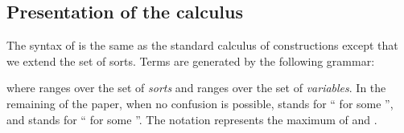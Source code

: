 \documentclass[a4paper,USenglish]{lipics}
\def\ecc{\textsf{ECC}\xspace}
\def\cic{\textsf{CIC}\xspace}
\def\cicr{\xspace}
\newcommand{\ECC}{{\ecc}}
\begin{document}
\begin{comment}
In  any  is populated with two classes of inhabitants:
\begin{enumerate}
   \item The class of \emph{arities} consists of expressions
 convertible to a sort (,  or  with ) or to a product
concluded by a sort (e.g. , , , ...).
   \item The class of \emph{simple types} consists of the remaining expressions. It contains all the inhabitants of  and 
    and also types in high universes like  or
    with .
\end{enumerate}


We observe the same
phenomenon in the proof of strong normalization of \ECC (the calculus of
constructions with universes, -types and an impredicative sort for
propositions) \cite{DBLP:conf/lics/Luo89, Luo90}. In order to adapt proof techniques
used for the calculus of constructions without universes to his calculus, the
author had to prove beforehand a ``quasinormalization'' theorem for assigning a
rank to expressions of type  from the shape of their head-normal
forms.

The central claim of our article is that the cohabitation of arities and
simple types in the same sort may be seen as a lack of typing of \cic. We
propose here a refinement of \cic which gives different types to
arities and simple types.
\end{comment}

\subsection{Presentation of the calculus}

The syntax of \cicr is the same as the standard calculus of
constructions except that we extend the set of sorts. Terms are generated by the following grammar:
\newcommand{\pouf}{\hspace{0.8em}}
 
\begin{comment}

\end{comment}
where  ranges over the set
  of \emph{sorts}
and  ranges over the set of \emph{variables}.
In the remaining of the paper, when no confusion is possible, 
stands for `` for some '', and  stands for ``
for some ''.
The notation  represents the maximum of  and .
\end{document}
